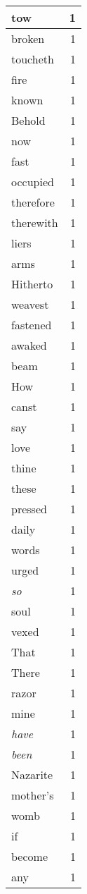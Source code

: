 \begin{center}
\begin{longtable}{l|r}
tow & 1\\ \hline 
broken & 1\\ \hline 
toucheth & 1\\ \hline 
fire & 1\\ \hline 
known & 1\\ \hline 
Behold & 1\\ \hline 
now & 1\\ \hline 
fast & 1\\ \hline 
occupied & 1\\ \hline 
therefore & 1\\ \hline 
therewith & 1\\ \hline 
liers & 1\\ \hline 
arms & 1\\ \hline 
Hitherto & 1\\ \hline 
weavest & 1\\ \hline 
fastened & 1\\ \hline 
awaked & 1\\ \hline 
beam & 1\\ \hline 
How & 1\\ \hline 
canst & 1\\ \hline 
say & 1\\ \hline 
love & 1\\ \hline 
thine & 1\\ \hline 
these & 1\\ \hline 
pressed & 1\\ \hline 
daily & 1\\ \hline 
words & 1\\ \hline 
urged & 1\\ \hline 
\emph{so} & 1\\ \hline 
soul & 1\\ \hline 
vexed & 1\\ \hline 
That & 1\\ \hline 
There & 1\\ \hline 
razor & 1\\ \hline 
mine & 1\\ \hline 
\emph{have} & 1\\ \hline 
\emph{been} & 1\\ \hline 
Nazarite & 1\\ \hline 
mother's & 1\\ \hline 
womb & 1\\ \hline 
if & 1\\ \hline 
become & 1\\ \hline 
any & 1\\ \hline 

\end{longtable}
\end{center}
